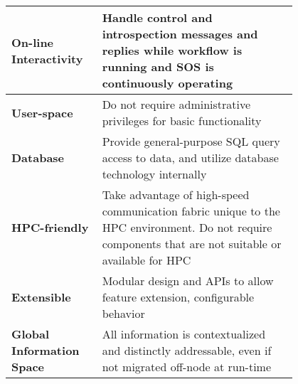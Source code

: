\begin{table*}[t]
\begin{tabular}{|p{0.2\linewidth}|p{0.6\linewidth}|}
\hline %
%
\textbf{On-line Interactivity}
&
Handle control and introspection messages and replies while
workflow is running and SOS is continuously operating
\\
%
%
\hline %
%
\textbf{User-space}
&
Do not require administrative privileges for basic functionality
\\
%
%
\hline %
%
\textbf{Database}
&
Provide general-purpose SQL query access to data, and utilize
database technology internally
\\
%
%
\hline %
%
\textbf{HPC-friendly}
&
Take advantage of high-speed communication fabric unique to the
HPC environment.  Do not require components that are not suitable or
available for HPC
\\
%
%
\hline %
%
\textbf{Extensible}
&
Modular design and APIs to allow feature extension, configurable
behavior
\\
%
%
\hline %
%
\textbf{Global Information Space}
&
All information is contextualized and distinctly addressable, even
if not migrated off-node at run-time
\\
%
%
\hline %
\end{tabular}
\end{table*}


